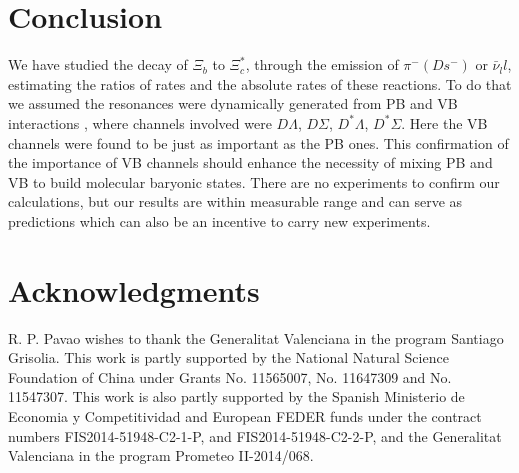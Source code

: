 \documentclass{PoS}
\begin{document}
\section{Conclusion}
We have studied the decay of $\Xi_b$ to $\Xi_c^{*}$, through the emission of $\pi^- (Ds^-)$ or $\bar{\nu}_l l$, estimating the ratios of rates and the absolute rates of these reactions. To do that we assumed the resonances were dynamically generated from PB and VB interactions \cite{romanets}, where channels involved were $D \Lambda$, $D \Sigma$, $D^* \Lambda$, $D^* \Sigma$. Here the VB channels were found to be just as important as the PB ones. This confirmation of the importance of VB channels should enhance the necessity of mixing PB and VB to build molecular baryonic states. There are no experiments to confirm our calculations, but our results are within measurable range and can serve as predictions which can also be an incentive to carry new experiments. 




\section*{Acknowledgments}
R. P. Pavao wishes to thank the Generalitat Valenciana in the program Santiago Grisolia.
This work is partly supported by the
National Natural Science Foundation of China under Grants No. 11565007, No. 11647309 and No. 11547307.
This work is also partly supported by the Spanish Ministerio
de Economia y Competitividad and European FEDER funds
under the contract numbers  FIS2014-51948-C2-1-P, and FIS2014-51948-C2-2-P, and the Generalitat Valenciana
in the program Prometeo II-2014/068.
\end{document}
